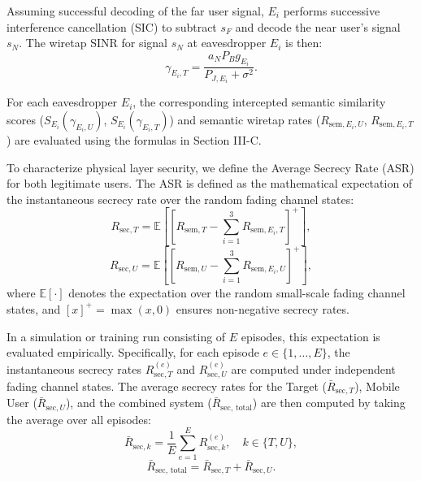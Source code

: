 \documentclass[journal,onecolumn]{IEEEtran}
\begin{document}
Assuming successful decoding of the far user signal, $E_i$ performs successive interference cancellation (SIC) to subtract $s_F$ and decode the near user's signal $s_N$. The wiretap SINR for signal $s_N$ at eavesdropper $E_i$ is then:
\begin{equation}
    \gamma_{E_i, T} = \frac{a_N P_B g_{E_i}}{P_{J, E_i} + \sigma^2}.
\end{equation}

For each eavesdropper $E_i$, the corresponding intercepted semantic similarity scores ($S_{E_i}(\gamma_{E_i, U})$, $S_{E_i}(\gamma_{E_i, T})$) and semantic wiretap rates ($R_{\text{sem}, E_i, U}$, $R_{\text{sem}, E_i, T}$) are evaluated using the formulas in Section III-C.

To characterize physical layer security, we define the Average Secrecy Rate (ASR) for both legitimate users. The ASR is defined as the mathematical expectation of the instantaneous secrecy rate over the random fading channel states:
\begin{equation}
    R_{\text{sec}, T} = \mathbb{E} \left[ \left[ R_{\text{sem}, T} - \sum_{i=1}^3 R_{\text{sem}, E_i, T} \right]^+ \right],
\end{equation}
\begin{equation}
    R_{\text{sec}, U} = \mathbb{E} \left[ \left[ R_{\text{sem}, U} - \sum_{i=1}^3 R_{\text{sem}, E_i, U} \right]^+ \right],
\end{equation}
where $\mathbb{E}[\cdot]$ denotes the expectation over the random small-scale fading channel states, and $[x]^+ = \max(x, 0)$ ensures non-negative secrecy rates. 

In a simulation or training run consisting of $E$ episodes, this expectation is evaluated empirically. Specifically, for each episode $e \in \{1, \dots, E\}$, the instantaneous secrecy rates $R_{\text{sec}, T}^{(e)}$ and $R_{\text{sec}, U}^{(e)}$ are computed under independent fading channel states. The average secrecy rates for the Target ($\bar{R}_{\text{sec}, T}$), Mobile User ($\bar{R}_{\text{sec}, U}$), and the combined system ($\bar{R}_{\text{sec, total}}$) are then computed by taking the average over all episodes:
\begin{equation}
    \bar{R}_{\text{sec}, k} = \frac{1}{E} \sum_{e=1}^{E} R_{\text{sec}, k}^{(e)}, \quad k \in \{T, U\},
\end{equation}
\begin{equation}
    \bar{R}_{\text{sec, total}} = \bar{R}_{\text{sec}, T} + \bar{R}_{\text{sec}, U}.
\end{equation}
\end{document}
